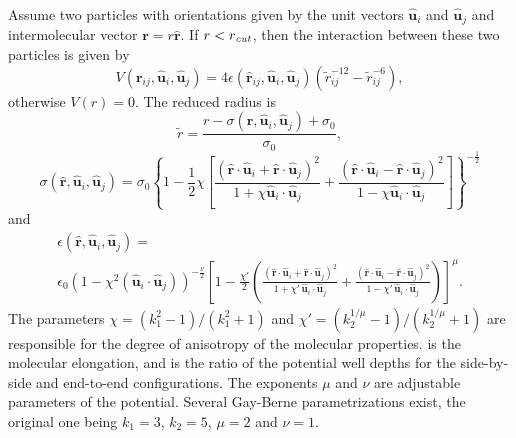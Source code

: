 Assume two particles with orientations given by the unit vectors
$\mathbf{\hat{u}}_i$ and $\mathbf{\hat{u}}_j$ and intermolecular vector
$\mathbf{r} = r\mathbf{\hat{r}}$. If $r<r_\text{\mbox{\textrm{\textit{cut}}}}$, then the
interaction between these two particles is given by
\begin{equation}
  V(\mathbf{r}_{ij}, \mathbf{\hat{u}}_i, \mathbf{\hat{u}}_j) = 4
  \epsilon(\mathbf{\hat{r}}_{ij}, \mathbf{\hat{u}}_i,
  \mathbf{\hat{u}}_j) \left( \tilde{r}_{ij}^{-12}-\tilde{r}_{ij}^{-6}
  \right),
\end{equation}
otherwise $V(r)=0$. The reduced radius is
\begin{equation}
  \tilde{r}=\frac{r - \sigma(\mathbf{\hat{r}},
    \mathbf{\hat{u}}_i, \mathbf{\hat{u}}_j)+\sigma_0}{\sigma_0},
\end{equation}
\begin{equation}
  \sigma( \mathbf{\hat{r}}, \mathbf{\hat{u}}_i,
  \mathbf{\hat{u}}_j) = \sigma_{0} \left\{ 1 - \frac{1}{2} \chi \left[
      \frac{ \left( \mathbf{\hat{r}} \cdot \mathbf{\hat{u}}_i +
          \mathbf{\hat{r}} \cdot \mathbf{\hat{u}}_j \right)^{2} }
      {1 + \chi \mathbf{\hat{u}}_i \cdot \mathbf{\hat{u}}_j } +
      \frac{ \left( \mathbf{\hat{r}} \cdot \mathbf{\hat{u}}_i -
          \mathbf{\hat{r}} \cdot \mathbf{\hat{u}}_j \right)^{2} }
      {1 - \chi \mathbf{\hat{u}}_i \cdot \mathbf{\hat{u}}_j}
    \right] \right\}^{-\frac{1}{2}}
\end{equation}
and
\begin{multline}
  \epsilon(\mathbf{\hat{r}}, \mathbf{\hat{u}}_i,
  \mathbf{\hat{u}}_j) = \\
  \epsilon_0 \left( 1- \chi^{2}(\mathbf{\hat{u}}_i
    \cdot \mathbf{\hat{u}}_j) \right)^{-\frac {\nu}{2}} \left[1-\frac
    {\chi'}{2} \left( \frac { (\mathbf{\hat{r}} \cdot
        \mathbf{\hat{u}}_i+ \mathbf{\hat{r}} \cdot
        \mathbf{\hat{u}}_j)^{2}} {1+\chi' \, \mathbf{\hat{u}}_i \cdot
        \mathbf{\hat{u}}_j }+ \frac {(\mathbf{\hat{r}} \cdot
        \mathbf{\hat{u}}_i-\mathbf{\hat{r}} \cdot
        \mathbf{\hat{u}}_j)^{2}} {1-\chi' \, \mathbf{\hat{u}}_i \cdot
        \mathbf{\hat{u}}_j } \right) \right]^{\mu}.
\end{multline}
The parameters $\chi = \left(k_1^{2} - 1\right)/\left(k_1^{2} + 1\right)$ and
$\chi' = \left(k_2^{1/\mu} - 1\right)/\left(k_2^{1/\mu} + 1\right)$ are
responsible for the degree of anisotropy of the molecular properties.
 is the molecular elongation, and  is the ratio of the
potential well depths for the side-by-side and end-to-end configurations.  The
exponents $ \mu $ and $ \nu $ are adjustable parameters of the potential.
Several Gay-Berne parametrizations exist, the original one being $k_1 = 3$,
$k_2 = 5$, $\mu = 2$ and $\nu = 1$.

